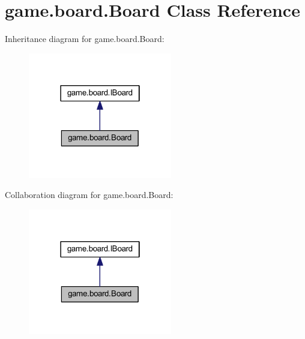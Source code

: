 \hypertarget{classgame_1_1board_1_1_board}{}\section{game.\+board.\+Board Class Reference}
\label{classgame_1_1board_1_1_board}


Inheritance diagram for game.\+board.\+Board\+:
\nopagebreak
\begin{figure}[H]
\begin{center}
\leavevmode
\includegraphics[width=178pt]{classgame_1_1board_1_1_board__inherit__graph}
\end{center}
\end{figure}


Collaboration diagram for game.\+board.\+Board\+:
\nopagebreak
\begin{figure}[H]
\begin{center}
\leavevmode
\includegraphics[width=178pt]{classgame_1_1board_1_1_board__coll__graph}
\end{center}
\end{figure}
